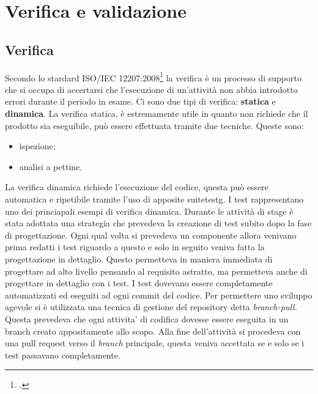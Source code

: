 
\chapter{Verifica e validazione}
\label{cap:verifica-validazione}
\section{Verifica}
Secondo lo stardard ISO/IEC 12207:2008\footcite{ISO:Systems-and-software-engineering} la verifica è un processo di supporto che si occupa di accertarsi che l’esecuzione di un'attività non abbia introdotto errori durante il periodo in esame. 
Ci sono due tipi di verifica: \textbf{statica} e \textbf{dinamica}.
La verifica statica, è estremamente utile in quanto non richiede che il prodotto sia eseguibile, può essere effettuata tramite due tecniche. Queste sono:
\begin{itemize}
    \item ispezione;
    \item analisi a pettine.
\end{itemize}
La verifica dinamica richiede l'esecuzione del codice, questa può essere automatica e ripetibile tramite l'uso di apposite \gls{suitetestg}\glsfirstoccur. I test rappresentano uno dei princiapali esempi di verifica dinamica. Durante le attività di stage è stata adottata una strategia che prevedeva la creazione di test subito dopo la fase di progettazione. Ogni qual volta si prevedeva un componente allora venivano prima redatti i test riguardo a questo e solo in seguito veniva fatta la progettazione in dettaglio. Questo permetteva in maniera immediata di progettare ad alto livello pensando al requisito astratto, ma permetteva anche di progettare in dettaglio con i test.
I test dovevano essere completamente automatizzati ed eseguiti ad ogni commit del codice. 
Per permettere uno sviluppo agevole si è utilizzata una tecnica di gestione del repository detta \emph{branch-pull}.\\
Questa prevedeva che ogni attivita’ di codifica dovesse essere eseguita in un branch creato appositamente allo scopo. Alla fine dell'attività si procedeva con una pull request verso il \emph{branch} principale, questa veniva accettata se e solo se i test passavano completamente. \\

